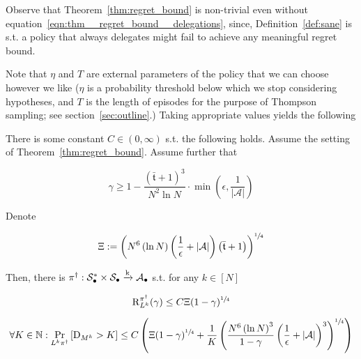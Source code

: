 \documentclass[anon,12pt]{colt2018} %
\newcommand{\AP}[1]{\left(#1\right)}
\newcommand{\AB}[1]{\left[#1\right]}
\newcommand{\Pa}[2]{\underset{#1}{\operatorname{Pr}}\AB{#2}}
\newcommand{\Nats}{\mathbb{N}}
\newcommand{\Abs}[1]{\left\vert #1 \right\vert}
\newcommand{\K}{\xrightarrow{\textnormal{k}}}
\newcommand{\A}{\mathcal{A}}
\newcommand{\St}{\mathcal{S}}
\newcommand{\Rg}{\operatorname{R}}
\newcommand{\MP}[2]{#1#2}
\newcommand{\Tn}{\mathfrak{t}}
\newcommand{\ND}{\operatorname{D}}
\newcommand{\RC}{\Xi}
\newcommand{\X}{\bullet}
\begin{document}
Observe that Theorem~\ref{thm:regret_bound} is non-trivial even without equation~\ref{eqn:thm__regret_bound__delegations}, since, Definition~\ref{def:sane} is s.t. a policy that always delegates might fail to achieve any meaningful regret bound.

Note that $\eta$ and $T$ are external parameters of the policy that we can choose however we like ($\eta$ is a probability threshold below which we stop considering hypotheses, and $T$ is the length of episodes for the purpose of Thompson sampling; see section~\ref{sec:outline}.) Taking appropriate values yields the following

\begin{samepage}
\begin{corollary}
\label{crl:balanced_regret_bound}

There is some constant $C \in (0,\infty)$ s.t. the following holds. Assume the setting of Theorem~\ref{thm:regret_bound}. Assume further that 

\begin{equation}
\label{eqn:crl__balanced_regret_bound__gamma}
\gamma \geq 1 - \frac{\AP{\bar{\Tn}+1}^3}{N^2 \ln{N}}\cdot\min\AP{\epsilon,\frac{1}{\Abs{\A}}}
\end{equation}

Denote

\begin{equation}
\label{eqn:crl__balanced_regret_bound__RC}
\RC:=\AP{N^6 \AP{\ln N} \AP{\frac{1}{\epsilon}+\Abs{\A}}\AP{\bar{\Tn}+1}}^{\sfrac{1}{4}}
\end{equation}

Then, there is $\pi^\dagger: \St_\X^* \times \St_\X \K \A_\X$ s.t. for any $k\in[N]$

\begin{equation}
\label{eqn:crl__balanced_regret_bound__regret}
\Rg_{L^k}^{\pi^\dagger}(\gamma) \leq C\RC(1-\gamma)^{\sfrac{1}{4}}
\end{equation}

\begin{equation}
\label{eqn:crl__balanced_regret_bound__delegations}
\forall K \in \Nats: \Pa{\MP{L^k}{\pi^\dagger}}{\ND_{M^k} > K} \leq C\AP{\Xi(1-\gamma)^{\sfrac{1}{4}}+\frac{1}{K}\AP{\frac{N^6\AP{\ln{N}}^3}{1-\gamma}\AP{\frac{1}{\epsilon}+\Abs{\A}}^3}^{\sfrac{1}{4}}}
\end{equation}

\end{corollary}
\end{samepage}
\end{document}
